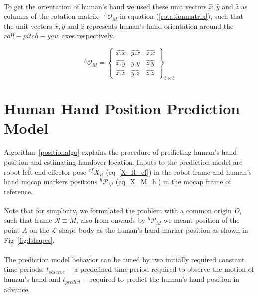 \documentclass[a4paper, 12pt, oneside]{Thesis}  %
\begin{document}
\paragraph*{}
To get the orientation of human's hand we used these unit vectors $\hat{x}, \hat{y}$ and $\hat{z}$ as columns of the rotation matrix~\cite{evans2001rotations, altmann2005rotations, jia2017rotation} ${}^{h}\mathcal{O}_{M}$ in equation (\ref{rotationmatrix}), such that the unit vectors $\hat{x}, \hat{y}$ and $\hat{z}$ represents human's hand orientation around the $roll-pitch-yaw$ axes respectively.

\begin{equation}\label{rotationmatrix}
{}^{h}\mathcal{O}_{M} = 
\left\{\begin{array}{cccc}
\hat{x.x} & \hat{y.x} & \hat{z.x} \\
\hat{x.y} & \hat{y.y} & \hat{z.y} \\
\hat{x.z} & \hat{y.z} & \hat{z.z}
\end{array}\right\}_{3\times 3}
\end{equation}



\clearpage
\section{Human Hand Position Prediction Model}\label{prediction_model}
Algorithm~\ref{positionalgo} explains the procedure of predicting human's hand position and estimating handover location. Inputs to the prediction model are robot left end-effector pose $\mathcal{}^{ef}{X}_R$ (eq~\ref{X_R_ef}) in the robot frame and human's hand mocap markers positions ${}^{h}\mathcal{P}_M$ (eq~\ref{X_M_h}) in the mocap frame of reference.

\paragraph*{}
Note that for simplicity, we formulated the problem with a common origin {\it O}, such that frame $\mathcal R \equiv M$, also from onwards by ${}^{h}\mathcal{P}_M$ we meant position of the point $A$ on the $\mathcal{L}$ shape body as the human's hand marker position as shown in Fig~\ref{fig:lshapes}.


\paragraph*{}
The prediction model behavior can be tuned by two initially required constant time periods, $t_{observe}$ ---a predefined time period required to observe the motion of human's hand and $t_{predict}$ ---required to predict the human's hand position in advance.
\end{document}
